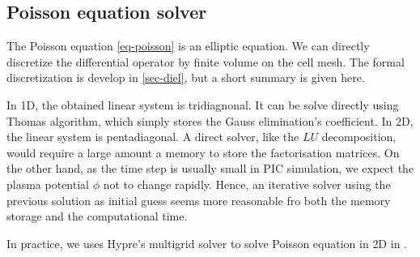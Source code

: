   \subsection{Poisson equation solver}
  \label{subsec-poissonintro}

    The Poisson equation \cref{eq-poisson} is an elliptic equation.
    We can directly discretize the differential operator by finite volume on the cell mesh.
    The formal discretization is develop in \cref{sec-diel}, but a short summary is given here.

    In \ac{1D}, the obtained linear system is tridiagnonal.
    It can be solve directly using {\sc Thomas} algorithm, which simply stores the Gauss elimination's coefficient.
    In \ac{2D}, the linear system is pentadiagonal.
    A direct solver, like the $LU$ decomposition, would require a large amount a memory to store the factorisation matrices.
    On the other hand, as the time step is usually small in \ac{PIC} simulation, we expect the plasma potential $\phi$ not to change rapidly.
    Hence, an iterative solver using the previous solution as initial guess seems more reasonable fro both the memory storage and the computational time.

    In practice, we uses {\sc Hypre}'s multigrid solver to solve Poisson equation in \ac{2D} in \LPPic.
